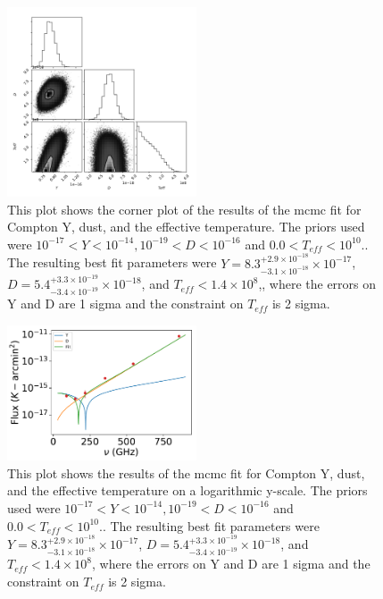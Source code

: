 \documentclass{princeton_astro_thesis}
\begin{document}
\begin{figure}[h]
\centering
\includegraphics[width=0.5\textwidth]{../redmapper_CornerTeffplot.pdf}
\caption{This plot shows the corner plot of the results of the mcmc fit for Compton Y, dust, and the effective temperature. The priors used were $ 10^{-17} < Y < 10^{-14}, 10^{-19}< D < 10^{-16}$ and $0.0 < T_{eff} <10^{10}.$. The resulting best fit parameters were $Y=8.3^{+2.9\times10^{-18}}_{-3.1\times10^{-18}}\times10^{-17}$, $D=5.4^{+3.3\times10^{-19}}_{-3.4\times10^{-19}}\times10^{-18}$, and $T_{eff}<1.4\times10^8$,, where the errors on Y and D are 1 sigma and the constraint on $T_{eff}$ is 2 sigma.}
\end{figure}

\begin{figure}[h]
\centering
\includegraphics[width=0.5\textwidth]{../redmapper_apfluxes_Tefffitlog.pdf}
\caption{This plot shows  the results of the mcmc fit for Compton Y, dust, and the effective temperature on a logarithmic y-scale. The priors used were $ 10^{-17} < Y < 10^{-14}, 10^{-19}< D < 10^{-16}$ and $0.0 < T_{eff} <10^{10}.$. The resulting best fit parameters were $Y=8.3^{+2.9\times10^{-18}}_{-3.1\times10^{-18}}\times10^{-17}$, $D=5.4^{+3.3\times10^{-19}}_{-3.4\times10^{-19}}\times10^{-18}$, and $T_{eff}<1.4\times10^8$, where the errors on Y and D are 1 sigma and the constraint on $T_{eff}$ is 2 sigma.}
\end{figure}
\end{document}
